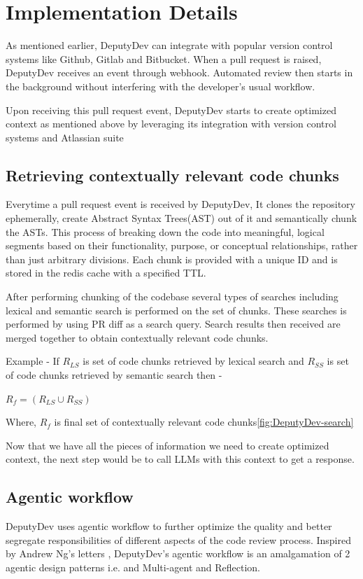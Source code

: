 \section{Implementation Details}
As mentioned earlier, DeputyDev can integrate with popular version control systems like Github, Gitlab and Bitbucket. When a pull request is raised, DeputyDev receives an event through webhook. Automated review then starts in the background without interfering with the developer's usual workflow.

Upon receiving this pull request event, DeputyDev starts to create optimized context as mentioned above by leveraging its integration with version control systems and Atlassian suite

\subsection{Retrieving contextually relevant code chunks}
Everytime a pull request event is received by DeputyDev, It clones the repository ephemerally, create Abstract Syntax Trees(AST) out of it and semantically chunk the ASTs. This process of breaking down the code into meaningful, logical segments based on their functionality, purpose, or conceptual relationships, rather than just arbitrary divisions. Each chunk is provided with a unique ID and is stored in the redis cache with a specified TTL.

After performing chunking of the codebase several types of searches including lexical and semantic search is performed on the set of chunks. These searches is performed by using PR diff as a search query. Search results then received are merged together to obtain contextually relevant code chunks.

Example - If $R_{LS}$ is set of code chunks retrieved by lexical search and $R_{SS}$ is set of code chunks retrieved by semantic search then -

$R_f = (R_{LS} \cup R_{SS})$

Where, $R_f$ is final set of contextually relevant code chunks\ref{fig:DeputyDev-search}

Now that we have all the pieces of information we need to create optimized context, the next step would be to call LLMs with this context to get a response.

\subsection{Agentic workflow}
DeputyDev uses agentic workflow to further optimize the quality and better segregate responsibilities of different aspects of the code review process. Inspired by Andrew Ng's letters \cite{deeplearningFourAgent}, DeputyDev's agentic workflow is an amalgamation of 2 agentic design patterns i.e. and Multi-agent and Reflection.

